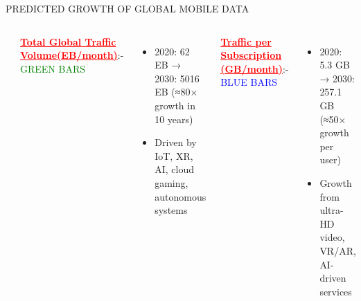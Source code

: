 \documentclass{beamer}
\begin{document}
\begin{frame}{PREDICTED GROWTH OF GLOBAL MOBILE DATA}
    \begin{columns}
        \includegraphics[width=\linewidth]{graph.jpg}

        
        \textcolor{red}{\underline{\textbf{Total Global Traffic Volume(EB/month)}}}:-
        \textcolor{green}{GREEN BARS}
        \begin{itemize}
            \item 2020: 62 EB → 2030: 5016 EB (≈80× growth in 10 years)
            \item Driven by IoT, XR, AI, cloud gaming, autonomous systems
        \end{itemize}

        \vspace{0.5em} %
        \textcolor{red}{\underline{\textbf{Traffic per Subscription (GB/month)}}}:-
        \textcolor{blue}{BLUE BARS}
        \begin{itemize}
            \item 2020: 5.3 GB → 2030: 257.1 GB (≈50× growth per user)
            \item Growth from ultra-HD video, VR/AR, AI-driven services
        \end{itemize}

    \end{columns}
\end{frame}
\end{document}
